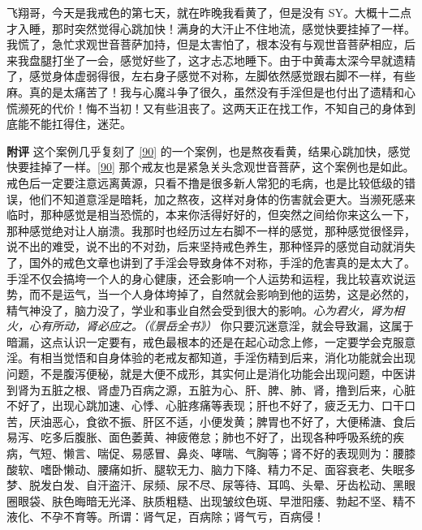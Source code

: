 \begin{case}
    飞翔哥，今天是我戒色的第七天，就在昨晚我看黄了，但是没有 SY。大概十二点才入睡，那时突然觉得心跳加快！满身的大汗止不住地流，感觉快要挂掉了一样。我慌了，急忙求观世音菩萨加持，但是太害怕了，根本没有与观世音菩萨相应，后来我盘腿打坐了一会，感觉好些了，这才忐忑地睡下。由于中黄毒太深今早就遗精了，感觉身体虚弱得很，左右身子感觉不对称，左脚依然感觉跟右脚不一样，有些麻。真的是太痛苦了！我与心魔斗争了很久，虽然没有手淫但是也付出了遗精和心慌濒死的代价！悔不当初！又有些沮丧了。这两天正在找工作，不知自己的身体到底能不能扛得住，迷茫。

    \textbf{附评} 这个案例几乎复刻了 \ref{90} 的一个案例，也是熬夜看黄，结果心跳加快，感觉快要挂掉了一样。\ref{90} 那个戒友也是紧急关头念观世音菩萨，这个案例也是如此。戒色后一定要注意远离黄源，只看不撸是很多新人常犯的毛病，也是比较低级的错误，他们不知道意淫是暗耗，加之熬夜，这样对身体的伤害就会更大。当濒死感来临时，那种感觉是相当恐慌的，本来你活得好好的，但突然之间给你来这么一下，那种感觉绝对让人崩溃。我那时也经历过左右脚不一样的感觉，那种感觉很怪异，说不出的难受，说不出的不对劲，后来坚持戒色养生，那种怪异的感觉自动就消失了，国外的戒色文章也讲到了手淫会导致身体不对称，手淫的危害真的是太大了。手淫不仅会搞垮一个人的身心健康，还会影响一个人运势和运程，我比较喜欢说运势，而不是运气，当一个人身体垮掉了，自然就会影响到他的运势，这是必然的，精气神没了，脑力没了，学业和事业自然会受到很大的影响。\textit{心为君火，肾为相火，心有所动，肾必应之。（《景岳全书》）} 你只要沉迷意淫，就会导致漏，这属于暗漏，这点认识一定要有，戒色最根本的还是在起心动念上修，一定要学会克服意淫。有相当觉悟和自身体验的老戒友都知道，手淫伤精到后来，消化功能就会出现问题，不是腹泻便秘，就是大便不成形，其实何止是消化功能会出现问题，中医讲到肾为五脏之根、肾虚乃百病之源，五脏为心、肝、脾、肺、肾，撸到后来，心脏不好了，出现心跳加速、心悸、心脏疼痛等表现；肝也不好了，疲乏无力、口干口苦，厌油恶心，食欲不振、肝区不适，小便发黄；脾胃也不好了，大便稀溏、食后易泻、吃多后腹胀、面色萎黄、神疲倦怠；肺也不好了，出现各种呼吸系统的疾病，气短、懒言、喘促、易感冒、鼻炎、哮喘、气胸等；肾不好的表现则为：腰膝酸软、嗜卧懒动、腰痛如折、腿软无力、脑力下降、精力不足、面容衰老、失眠多梦、脱发白发、自汗盗汗、尿频、尿不尽、尿等待、耳鸣、头晕、牙齿松动、黑眼圈眼袋、肤色晦暗无光泽、肤质粗糙、出现皱纹色斑、早泄阳痿、勃起不坚、精不液化、不孕不育等。所谓：肾气足，百病除；肾气亏，百病侵！
\end{case}

